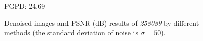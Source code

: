 \begin{figure}[ht!]
{\begin{minipage}[t]{0.24\textwidth}
{\footnotesize PGPD: 24.69}
\end{minipage}
}\vspace{-3mm}
\caption{Denoised images and PSNR (dB) results of \textsl{258089} by different methods (the standard deviation of noise is $\sigma=50$).}
    \label{fig2-16}
\end{figure}

\begin{figure}[ht!]
    \centering
{}
\end{figure}
